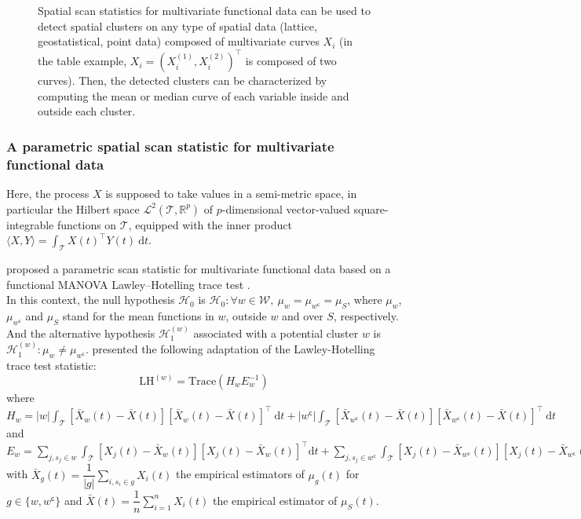 \begin{figure}[h!]
{Spatial scan statistics for multivariate functional data can be used to detect spatial clusters on any type of spatial data (lattice, geostatistical, point data) composed of multivariate curves $X_i$ (in the table example, $X_i = (X_i^{(1)}, X_i^{(2)})^\top$ is composed of two curves). Then, the detected clusters can be characterized by computing the mean or median curve of each variable inside and outside each cluster.
}
\label{fig:schema_multifonc}
\end{figure}


\subsubsection{A parametric spatial scan statistic for multivariate functional data}


\noindent Here, the process $X$ is supposed to take values in a semi-metric space, in particular the Hilbert space $\mathcal{L}^2(\mathcal{T}, \mathbb{R}^p)$ of $p$-dimensional vector-valued square-integrable functions on $\mathcal{T}$, equipped with the inner product $\displaystyle{\langle X, Y \rangle = \int_{\mathcal{T}} X(t)^\top Y(t) \ \text{d}t}$.

\noindent \citet{notre_fonctionnel1} proposed a parametric scan statistic for multivariate functional data based on a functional MANOVA Lawley–Hotelling trace test \citep{manovafonctional}.  \\

\noindent In this context, the null hypothesis $\mathcal{H}_0$ is $\mathcal{H}_0: \forall w \in \mathcal{W}, \ \mu_{w} = \mu_{w^\mathsf{c}} = \mu_S$, where $\mu_w$, $\mu_{w^\mathsf{c}}$ and $\mu_S$ stand for the mean functions in $w$, outside $w$ and over $S$, respectively. And the alternative hypothesis $\mathcal{H}_1^{(w)}$ associated with a potential cluster $w$ is $\mathcal{H}_1^{(w)}: \mu_{w} \neq \mu_{w^\mathsf{c}}$. \citet{manovafonctional} presented the following adaptation of the Lawley-Hotelling trace test statistic: 
$$
\mathrm{LH}^{(w)} = \text{Trace}(H_w E_w^{-1})$$
where
$\displaystyle{H_w = |w| \int_{\mathcal{T}} \left[\bar{X}_w(t) - \bar{X}(t) \right] \left[\bar{X}_w(t) - \bar{X}(t) \right]^\top \ \text{d}t + |w^\mathsf{c}| \int_{\mathcal{T}} \left[\bar{X}_{w^\mathsf{c}}(t) - \bar{X}(t) \right] \left[\bar{X}_{w^\mathsf{c}}(t) - \bar{X}(t) \right]^\top \ \text{d}t}$ \\ 
and $\displaystyle{E_w = \sum_{j, s_j \in w} \int_{\mathcal{T}} \left[X_j(t) - \bar{X}_w(t) \right] \left[X_j(t) - \bar{X}_w(t) \right]^\top \text{d}t + \sum_{j, s_j \in w^\mathsf{c}} \int_{\mathcal{T}} \left[X_j(t) - \bar{X}_{w^\mathsf{c}}(t) \right] \left[X_j(t) - \bar{X}_{w^\mathsf{c}}(t) \right]^\top \text{d}t}$ with $\displaystyle{\bar{X}_{g}(t) = \dfrac{1}{|g|} \sum_{i, s_i \in g} X_i(t)}$ the empirical estimators of $\mu_g(t)$ for $g \in \{w, w^\mathsf{c}\}$ and $\displaystyle{\bar{X}(t) = \dfrac{1}{n} \sum_{i = 1}^n X_i(t)}$ the empirical estimator of $\mu_S(t)$. \\

